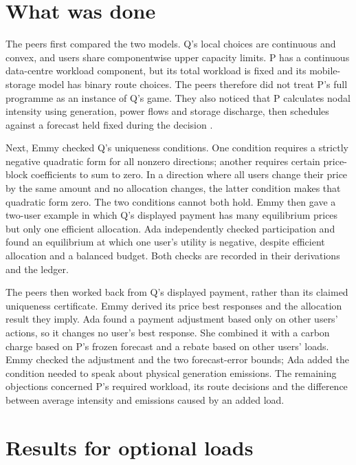 \documentclass{article}
\begin{document}
\section{What was done}

The peers first compared the two models. Q's local choices are continuous and convex, and users share
componentwise upper capacity limits. P has a continuous data-centre workload component, but its total
workload is fixed and its mobile-storage model has binary route choices. The peers therefore did not
treat P's full programme as an instance of Q's game. They also noticed that P calculates nodal intensity
using generation, power flows and storage discharge, then schedules against a forecast held fixed during
the decision \cite{Q,P}.

Next, Emmy checked Q's uniqueness conditions. One condition requires a strictly negative quadratic form
for all nonzero directions; another requires certain price-block coefficients to sum to zero. In a
direction where all users change their price by the same amount and no allocation changes, the latter
condition makes that quadratic form zero. The two conditions cannot both hold. Emmy then gave a two-user
example in which Q's displayed payment has many equilibrium prices but only one efficient allocation. Ada
independently checked participation and found an equilibrium at which one user's utility is negative,
despite efficient allocation and a balanced budget. Both checks are recorded in their derivations and the
ledger.

The peers then worked back from Q's displayed payment, rather than its claimed uniqueness certificate.
Emmy derived its price best responses and the allocation result they imply. Ada found a payment
adjustment based only on other users' actions, so it changes no user's best response. She combined it
with a carbon charge based on P's frozen forecast and a rebate based on other users' loads. Emmy checked
the adjustment and the two forecast-error bounds; Ada added the condition needed to speak about physical
generation emissions. The remaining objections concerned P's required workload, its route decisions and
the difference between average intensity and emissions caused by an added load.

\section{Results for optional loads}
\end{document}
